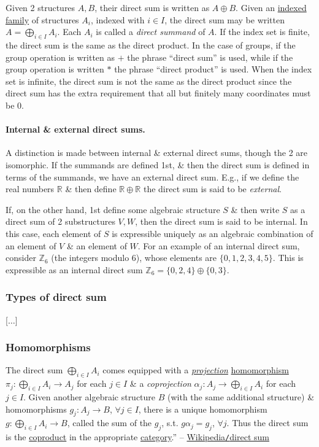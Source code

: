 \documentclass{article}
\begin{document}
Given 2 structures $A,B$, their direct sum is written as $A\oplus B$. Given an \href{https://en.wikipedia.org/wiki/Indexed_family}{indexed family} of structures $A_i$, indexed with $i\in I$, the direct sum may be written $A = \bigoplus_{i\in I} A_i$. Each $A_i$ is called a {\it direct summand} of $A$. If the index set is finite, the direct sum is the same as the direct product. In the case of groups, if the group operation is written as $+$ the phrase ``direct sum'' is used, while if the group operation is written $*$ the phrase ``direct product'' is used. When the index set is infinite, the direct sum is not the same as the direct product since the direct sum has the extra requirement that all but finitely many coordinates must be 0.

\paragraph{Internal \& external direct sums.} A distinction is made between internal \& external direct sums, though the 2 are isomorphic. If the summands are defined 1st, \& then the direct sum is defined in terms of the summands, we have an external direct sum. E.g., if we define the real numbers $\mathbb{R}$ \& then define $\mathbb{R}\oplus\mathbb{R}$ the direct sum is said to be {\it external}.

If, on the other hand, 1st define some algebraic structure $S$ \& then write $S$ as a direct sum of 2 substructures $V,W$, then the direct sum is said to be internal. In this case, each element of $S$ is expressible uniquely as an algebraic combination of an element of $V$ \& an element of $W$. For an example of an internal direct sum, consider $\mathbb{Z}_6$ (the integers modulo 6), whose elements are $\{0,1,2,3,4,5\}$. This is expressible as an internal direct sum $\mathbb{Z}_6 = \{0,2,4\}\oplus\{0,3\}$.

\subsubsection{Types of direct sum}
[$\ldots$]

\subsubsection{Homomorphisms}
The direct sum $\bigoplus_{i\in I} A_i$ comes equipped with a \href{https://en.wikipedia.org/wiki/Projection_(mathematics)}{\it projection} \href{https://en.wikipedia.org/wiki/Homomorphism}{homomorphism} $\pi_j:\bigoplus_{i\in I} A_i\to A_j$ for each $j\in I$ \& a {\it coprojection} $\alpha_j:A_j\to\bigoplus_{i\in I} A_i$ for each $j\in I$. Given another algebraic structure $B$ (with the same additional structure) \& homomorphisms $g_j:A_j\to B$, $\forall j\in I$, there is a unique homomorphism $g:\bigoplus_{i\in I} A_i\to B$, called the sum of the $g_j$, s.t. $g\alpha_j = g_j$, $\forall j$. Thus the direct sum is the \href{https://en.wikipedia.org/wiki/Coproduct}{coproduct} in the appropriate \href{https://en.wikipedia.org/wiki/Category_(mathematics)}{category}.'' -- \href{https://en.wikipedia.org/wiki/Direct_sum}{Wikipedia{\tt/}direct sum}
\end{document}
